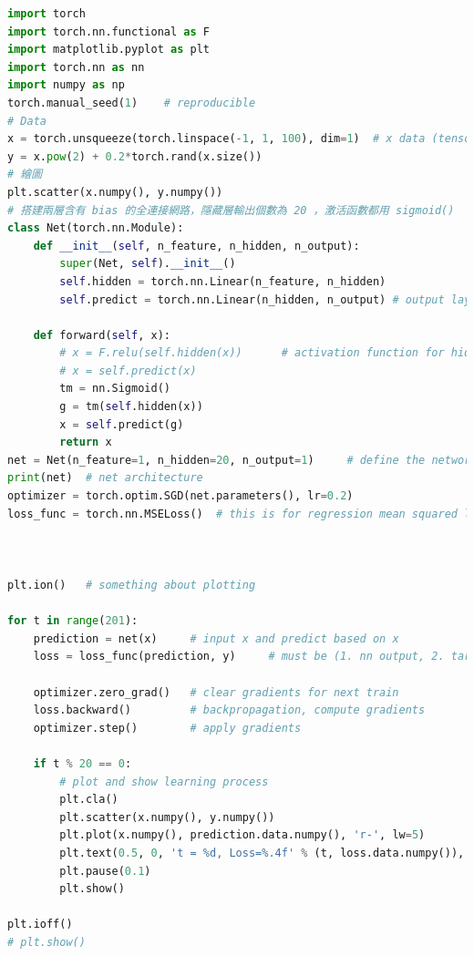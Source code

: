 \documentclass[11pt,UTF8]{ctexart}
\begin{document}
	\begin{lstlisting}[language={python}]
%matplotlib inline
import torch
import torch.nn.functional as F
import matplotlib.pyplot as plt
import torch.nn as nn
import numpy as np
torch.manual_seed(1)    # reproducible
# Data
x = torch.unsqueeze(torch.linspace(-1, 1, 100), dim=1)  # x data (tensor), shape=(100, 1)
y = x.pow(2) + 0.2*torch.rand(x.size())
# 繪圖
plt.scatter(x.numpy(), y.numpy())
# 搭建兩層含有 bias 的全連接網路，隱藏層輸出個數為 20 ，激活函數都用 sigmoid()
class Net(torch.nn.Module):
    def __init__(self, n_feature, n_hidden, n_output):
        super(Net, self).__init__()
        self.hidden = torch.nn.Linear(n_feature, n_hidden)
        self.predict = torch.nn.Linear(n_hidden, n_output) # output layer

    def forward(self, x):
        # x = F.relu(self.hidden(x))      # activation function for hidden layer
        # x = self.predict(x) 
        tm = nn.Sigmoid()
        g = tm(self.hidden(x))
        x = self.predict(g)
        return x
net = Net(n_feature=1, n_hidden=20, n_output=1)     # define the network
print(net)  # net architecture
optimizer = torch.optim.SGD(net.parameters(), lr=0.2)
loss_func = torch.nn.MSELoss()  # this is for regression mean squared loss



plt.ion()   # something about plotting

for t in range(201):
    prediction = net(x)     # input x and predict based on x
    loss = loss_func(prediction, y)     # must be (1. nn output, 2. target)

    optimizer.zero_grad()   # clear gradients for next train
    loss.backward()         # backpropagation, compute gradients
    optimizer.step()        # apply gradients

    if t % 20 == 0:
        # plot and show learning process
        plt.cla()
        plt.scatter(x.numpy(), y.numpy())
        plt.plot(x.numpy(), prediction.data.numpy(), 'r-', lw=5)
        plt.text(0.5, 0, 't = %d, Loss=%.4f' % (t, loss.data.numpy()), fontdict={'size': 20, 'color':  'red'})
        plt.pause(0.1)
        plt.show()

plt.ioff()
# plt.show()
	\end{lstlisting}

\clearpage
\end{document}
